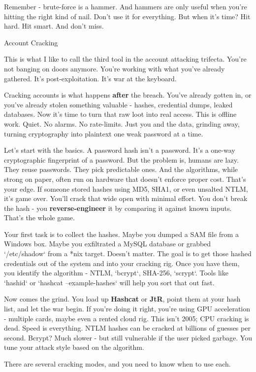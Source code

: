 Remember - brute-force is a hammer. And hammers are only useful when you’re hitting the right kind of nail. Don’t use it for everything. But when it’s time? Hit hard. Hit smart. And don’t miss.

Account Cracking

This is what I like to call the third tool in the account attacking trifecta. You’re not banging on doors anymore. You’re working with what you’ve already gathered. It’s post-exploitation. It’s war at the keyboard.

Cracking accounts is what happens \textbf{after} the breach. You’ve already gotten in, or you’ve already stolen something valuable - hashes, credential dumps, leaked databases. Now it’s time to turn that raw loot into real access. This is offline work. Quiet. No alarms. No rate-limits. Just you and the data, grinding away, turning cryptography into plaintext one weak password at a time.

Let’s start with the basics. A password hash isn’t a password. It’s a one-way cryptographic fingerprint of a password. But the problem is, humans are lazy. They reuse passwords. They pick predictable ones. And the algorithms, while strong on paper, often run on hardware that doesn’t enforce proper cost. That’s your edge. If someone stored hashes using MD5, SHA1, or even unsalted NTLM, it’s game over. You’ll crack that wide open with minimal effort. You don’t break the hash - you \textbf{reverse-engineer} it by comparing it against known inputs. That’s the whole game.

Your first task is to collect the hashes. Maybe you dumped a SAM file from a Windows box. Maybe you exfiltrated a MySQL database or grabbed `/etc/shadow` from a *nix target. Doesn’t matter. The goal is to get those hashed credentials out of the system and into your cracking rig. Once you have them, you identify the algorithm - NTLM, `bcrypt`, SHA-256, `scrypt`. Tools like `hashid` or `hashcat –example-hashes` will help you sort that out fast.

Now comes the grind. You load up \textbf{Hashcat }or \textbf{JtR}, point them at your hash list, and let the war begin. If you’re doing it right, you’re using GPU acceleration - multiple cards, maybe even a rented cloud rig. This isn’t 2005; CPU cracking is dead. Speed is everything. NTLM hashes can be cracked at billions of guesses per second. Bcrypt? Much slower - but still vulnerable if the user picked garbage. You tune your attack style based on the algorithm.

There are several cracking modes, and you need to know when to use each.

